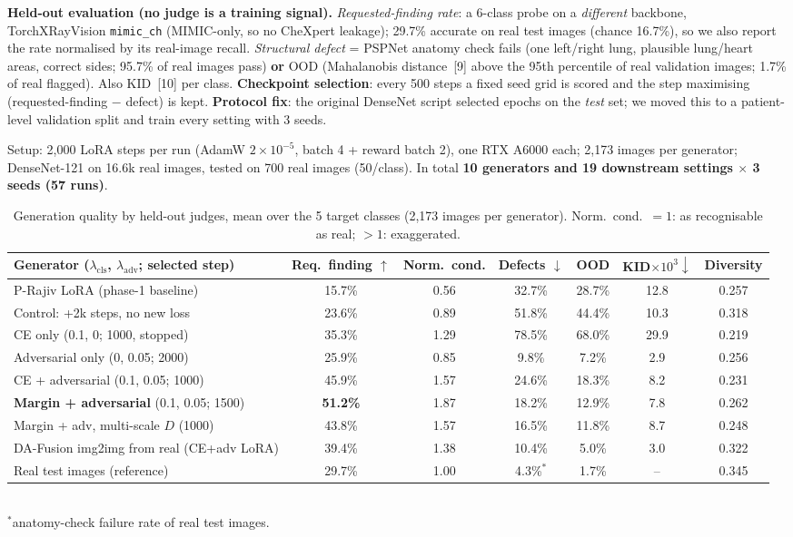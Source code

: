 \documentclass[10pt]{article}
\newcommand{\sect}[1]{\vspace{2pt}{\large\bf #1}\par}
\begin{document}
\textbf{Held-out evaluation (no judge is a training signal).} \emph{Requested-finding rate}: a 6-class probe on a \emph{different} backbone, TorchXRayVision \texttt{mimic\_ch} (MIMIC-only, so no CheXpert leakage); 29.7\% accurate on real test images (chance 16.7\%), so we also report the rate normalised by its real-image recall. \emph{Structural defect} = PSPNet anatomy check fails (one left/right lung, plausible lung/heart areas, correct sides; 95.7\% of real images pass) \textbf{or} OOD (Mahalanobis distance~[9] above the 95th percentile of real validation images; 1.7\% of real flagged). Also KID~[10] per class. \textbf{Checkpoint selection}: every 500 steps a fixed seed grid is scored and the step maximising (requested-finding $-$ defect) is kept. \textbf{Protocol fix}: the original DenseNet script selected epochs on the \emph{test} set; we moved this to a patient-level validation split and train every setting with 3 seeds.

\sect{3\quad Experiments and results}
Setup: 2{,}000 LoRA steps per run (AdamW $2{\times}10^{-5}$, batch 4 + reward batch 2), one RTX A6000 each; 2{,}173 images per generator; DenseNet-121 on 16.6k real images, tested on 700 real images (50/class). In total \textbf{10 generators and 19 downstream settings $\times$ 3 seeds (57 runs)}.

\begin{table}[h]
\centering\footnotesize
\caption{Generation quality by held-out judges, mean over the 5 target classes (2{,}173 images per generator). Norm.\ cond.\ $=1$: as recognisable as real; $>1$: exaggerated.}\label{tab:gen}
\begin{tabular}{@{}lcccccc@{}}
\toprule
Generator ($\lambda_{\text{cls}}$, $\lambda_{\text{adv}}$; selected step) & Req.\ finding $\uparrow$ & Norm.\ cond. & Defects $\downarrow$ & OOD & KID$\times10^3\downarrow$ & Diversity\\
\midrule
P-Rajiv LoRA (phase-1 baseline) & 15.7\% & 0.56 & 32.7\% & 28.7\% & 12.8 & 0.257\\
Control: +2k steps, no new loss & 23.6\% & 0.89 & 51.8\% & 44.4\% & 10.3 & 0.318\\
CE only (0.1, 0; 1000, stopped) & 35.3\% & 1.29 & 78.5\% & 68.0\% & 29.9 & 0.219\\
Adversarial only (0, 0.05; 2000) & 25.9\% & 0.85 & 9.8\% & 7.2\% & 2.9 & 0.256\\
CE + adversarial (0.1, 0.05; 1000) & 45.9\% & 1.57 & 24.6\% & 18.3\% & 8.2 & 0.231\\
\textbf{Margin + adversarial} (0.1, 0.05; 1500) & \textbf{51.2\%} & 1.87 & 18.2\% & 12.9\% & 7.8 & 0.262\\
Margin + adv, multi-scale $D$ (1000) & 43.8\% & 1.57 & 16.5\% & 11.8\% & 8.7 & 0.248\\
DA-Fusion img2img from real (CE+adv LoRA) & 39.4\% & 1.38 & 10.4\% & 5.0\% & 3.0 & 0.322\\
\midrule
Real test images (reference) & 29.7\% & 1.00 & 4.3\%$^\ast$ & 1.7\% & -- & 0.345\\
\bottomrule
\end{tabular}\\[1pt]
{\scriptsize $^\ast$anatomy-check failure rate of real test images.}
\end{table}
\end{document}
